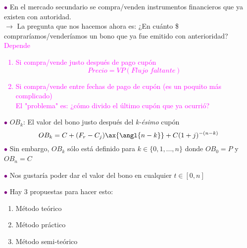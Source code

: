 \textcolor{purple}{$\bullet$} En el mercado secundario se compra/venden instrumentos financieros que ya existen con autoridad.\\
$\longrightarrow$ La pregunta que nos hacemos ahora es: ¿En cuánto \$ compraríamos/venderíamos un bono que ya fue emitido con anterioridad?\\
\textcolor{magenta}{Depende}
\textcolor{magenta}{\begin{enumerate}
    \item Si compra/vende justo después de pago cupón
    $$Precio=VP(\textit{Flujo faltante})$$
    \item Si compra/vende entre fechas de pago de cupón (es un poquito más complicado)\\
    El "problema" es: ¿cómo divido el último cupón que ya ocurrió?
\end{enumerate}}
\textcolor{purple}{$\bullet$} $OB_k$: El valor del bono justo después del \textit{k-ésimo} cupón\
$$OB_k=C+(F_r - C_j)\ax{\angl{n-k}} + C(1+j)^{-(n-k)}$$
\textcolor{purple}{$\bullet$} Sin embargo, $OB_k$ sólo está definido para $k\in\{0,1,...,n\}$ donde $OB_0=P$ y $OB_n=C$\

\textcolor{purple}{$\bullet$} Nos gustaría poder dar el valor del bono en cualquier $t\in[0,n]$\

\textcolor{purple}{$\bullet$} Hay 3 propuestas para hacer esto:
\begin{enumerate}
    \item Método teórico
    \item Método práctico
    \item Método semi-teórico
\end{enumerate}


